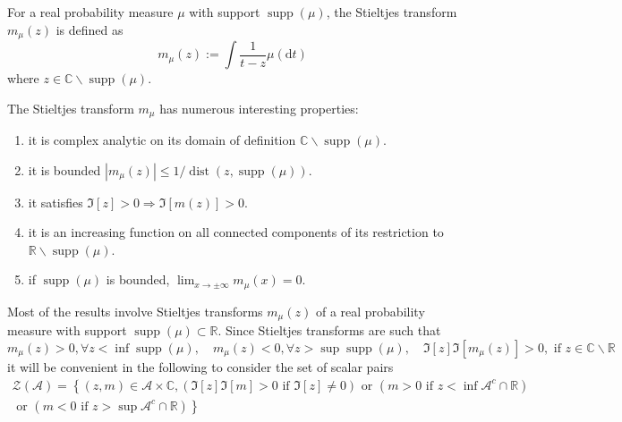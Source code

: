 \begin{definition}
	For a real probability measure $\mu$ with support $\operatorname{supp}(\mu)$, the Stieltjes transform $m_{\mu}(z)$ is defined as
	\begin{equation}
		m_{\mu}(z):=\int\frac{1}{t-z}\mu\left(\mathrm{d}t\right)
	\end{equation}
	where $z\in\mathbb{C}\backslash\operatorname{supp}(\mu)$.
\end{definition}

\begin{property}
	The Stieltjes transform $m_{\mu}$ has numerous interesting properties:
	\begin{enumerate}
		\item it is complex analytic on its domain of definition $\mathbb{C} \backslash \operatorname{supp}(\mu)$.
		\item it is bounded $\left|m_{\mu}(z)\right|\leq 1/\operatorname{dist}(z,\operatorname{supp}(\mu))$.
		\item it satisfies $\Im[z]>0 \Rightarrow \Im[m(z)]>0$.
		\item it is an increasing function on all connected components of its restriction to $\mathbb{R}\backslash\operatorname{supp}(\mu)$. %
		\item if $\operatorname{supp}(\mu)$ is bounded, $\lim_{x\rightarrow\pm\infty}m_{\mu}(x)=0$.
	\end{enumerate}
\end{property}

\begin{remark}
	Most of the results involve Stieltjes transforms $m_{\mu}(z)$ of a real probability measure with support $\operatorname{supp}(\mu) \subset \mathbb{R} .$ Since Stieltjes transforms are such that
	\begin{equation*}
		m_{\mu}(z)>0,\forall z<\inf\operatorname{supp}(\mu),\quad m_{\mu}(z)<0,\forall z>\sup \operatorname{supp}(\mu),\quad\Im[z] \Im\left[m_{\mu}(z)\right]>0,\text{ if }z\in\mathbb{C}\backslash\mathbb{R}
	\end{equation*}
	it will be convenient in the following to consider the set of scalar pairs
	\begin{equation*}
		\begin{array}{c}
			\mathcal{Z}(\mathcal{A})=\left\{(z,m)\in\mathcal{A}\times\mathbb{C},(\Im[z]\Im[m]>0\text{ if } \Im[z] \neq 0)\text{ or }\left(m>0\text{ if }z<\inf \mathcal{A}^{c} \cap \mathbb{R}\right)\right. \\
			\left.\text{ or }\left(m<0\text{ if }z>\sup \mathcal{A}^{c} \cap \mathbb{R}\right)\right\}
		\end{array}
	\end{equation*}
\end{remark}

